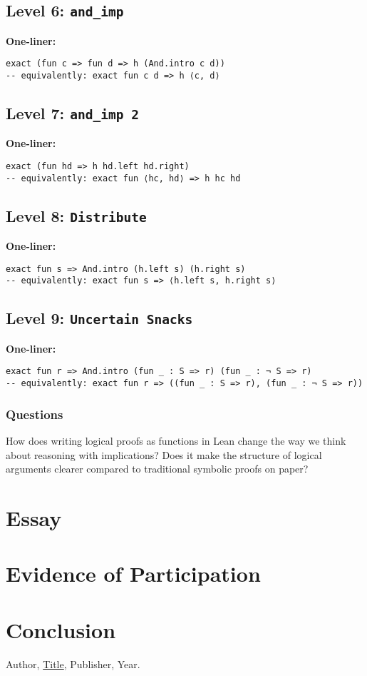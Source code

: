 \documentclass{article}
\theoremstyle{theorem}
\theoremstyle{definition}
\theoremstyle{remark}
\begin{document}
\subsection*{Level 6: \texttt{and\_imp}}

\noindent\textbf{One-liner:}
\begin{lstlisting}
exact (fun c => fun d => h (And.intro c d))
-- equivalently: exact fun c d => h ⟨c, d⟩
\end{lstlisting}

\subsection*{Level 7: \texttt{and\_imp 2}}

\noindent\textbf{One-liner:}
\begin{lstlisting}
exact (fun hd => h hd.left hd.right)
-- equivalently: exact fun ⟨hc, hd⟩ => h hc hd
\end{lstlisting}

\subsection*{Level 8: \texttt{Distribute}}

\noindent\textbf{One-liner:}
\begin{lstlisting}
exact fun s => And.intro (h.left s) (h.right s)
-- equivalently: exact fun s => ⟨h.left s, h.right s⟩
\end{lstlisting}

\subsection*{Level 9: \texttt{Uncertain Snacks}}

\noindent\textbf{One-liner:}
\begin{lstlisting}
exact fun r => And.intro (fun _ : S => r) (fun _ : ¬ S => r)
-- equivalently: exact fun r => ((fun _ : S => r), (fun _ : ¬ S => r))
\end{lstlisting}

\subsubsection{Questions}
How does writing logical proofs as functions in Lean change the way we think about reasoning with implications? 
Does it make the structure of logical arguments clearer compared to traditional symbolic proofs on paper?

\section{Essay}

\section{Evidence of Participation}

\section{Conclusion}\label{conclusion}

\begin{thebibliography}{99}
 Author, \href{https://en.wikipedia.org/wiki/LaTeX}{Title}, Publisher, Year.
\end{thebibliography}
\end{document}
